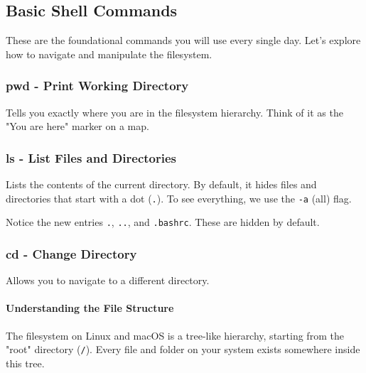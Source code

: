 \documentclass[11pt, a4paper]{article}
\newcommand{\cmd}[1]{\texttt{\textcolor{commandColor}{#1}}}
\begin{document}
\subsection{Basic Shell Commands}
These are the foundational commands you will use every single day. Let's explore how to navigate and manipulate the filesystem.

\subsubsection{pwd - Print Working Directory}
Tells you exactly where you are in the filesystem hierarchy. Think of it as the "You are here" marker on a map.


\subsubsection{ls - List Files and Directories}
Lists the contents of the current directory. By default, it hides files and directories that start with a dot (\texttt{.}). To see everything, we use the \cmd{-a} (all) flag.


Notice the new entries \texttt{.}, \texttt{..}, and \texttt{.bashrc}. These are hidden by default.

\subsubsection{cd - Change Directory}
Allows you to navigate to a different directory.

\paragraph{Understanding the File Structure}
The filesystem on Linux and macOS is a tree-like hierarchy, starting from the "root" directory (\cmd{/}). Every file and folder on your system exists somewhere inside this tree.
\end{document}
